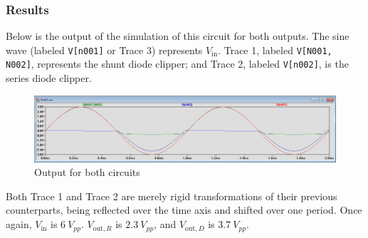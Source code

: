 \documentclass{article}
\begin{document}
\subsubsection{Results} Below is the output of the simulation
of this circuit for both outputs. The sine wave (labeled \texttt{V[n001]} or Trace 3)
represents \(V_\text{in}\). Trace 1, labeled \texttt{V[N001, N002]},
represents the shunt diode clipper; and Trace 2, labeled
\texttt{V[n002]}, is the series diode clipper.

\begin{figure}[h]
    \centering
    \includegraphics[width=\textwidth]{Images/3VACReverse.jpg}
    \caption{Output for both circuits}
\end{figure}

Both Trace 1 and Trace 2 are merely rigid transformations of their
previous counterparts, being reflected over the time axis and
shifted over one period.
Once again, \(V_\text{in}\) is \(\SI{6}{V}_{pp}\). \(V_{\text{out},R}\)
is \(\SI{2.3}{V}_{pp}\), and \(V_{\text{out},D}\) is \(\SI{3.7}{V}_{pp}\).
\end{document}
